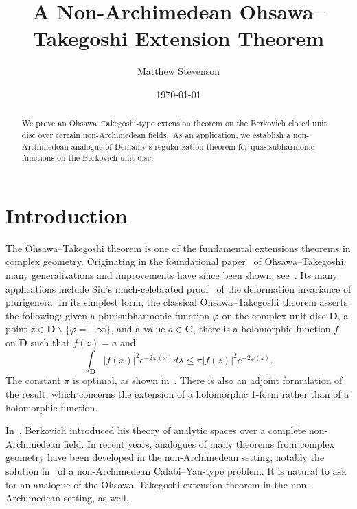 \documentclass[10pt,reqno]{amsart}
\author{Matthew Stevenson}
\title{A Non-Archimedean Ohsawa--Takegoshi Extension Theorem}
\date{\today}
\theoremstyle{plain}
\theoremstyle{definition}
\newcommand{\C}{\mathbf{C}}
\numberwithin{equation}{section}
\begin{document}
\maketitle

\begin{abstract}
We prove an Ohsawa--Takegoshi-type extension theorem on the Berkovich closed unit disc over certain non-Archimedean fields.\ As an application, we establish a non-Archimedean analogue of Demailly's regularization theorem for quasisubharmonic functions on the Berkovich unit disc.
\end{abstract}

\section{Introduction}\label{section:intro}

The Ohsawa--Takegoshi theorem is one of the fundamental extensions theorems in complex geometry. Originating in the foundational paper~\cite{ohsawa-takegoshi} of Ohsawa--Takegoshi, many generalizations and improvements have since been shown; see~\cite{manivel1993theoreme,berndtsson1996extension,siu1996fujita,demailly2000ohsawa,mcneal-varolin}. 
Its many applications include Siu's much-celebrated proof~\cite{siu1998invariance} of the deformation invariance of plurigenera.
In its simplest form, the classical Ohsawa--Takegoshi theorem asserts the following: given a plurisubharmonic function $\varphi$ on the complex unit disc $\mathbf{D}$, a point $z \in \mathbf{D} \backslash \{ \varphi = -\infty \}$, and a value $a \in \C$, there is a holomorphic function $f$ on $\mathbf{D}$ such that $f(z) = a$ and 
$$
\int_{\mathbf{D}} |f(x)|^2 e^{-2\varphi(x)} d\lambda \leq \pi|f(z)|^2 e^{-2\varphi(z)}.
$$
The constant $\pi$ is optimal, as shown in~\cite[Theorem 1]{blocki}. There is also an adjoint formulation of the result, which concerns the extension of a holomorphic 1-form rather than of a holomorphic function.

In~\cite{berkovich,berkovich93}, Berkovich introduced his theory of analytic spaces over a complete non-Archimedean field. 
In recent years, analogues of many theorems from complex geometry have been developed in the non-Archimedean setting, notably the solution in~\cite{bfj15} of a non-Archimedean Calabi--Yau-type problem. It is natural to ask for an analogue of the Ohsawa--Takegoshi extension theorem in the non-Archimedean setting, as well.
\end{document}
